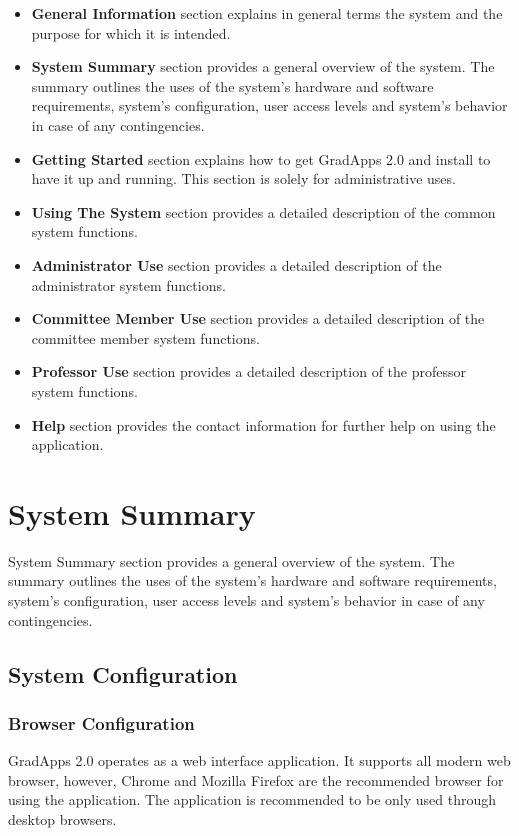 \documentclass[fontsize=12pt,paper=letter,twoside]{scrartcl}
\begin{document}
\begin{itemize}
\item \textbf{General Information} section explains in general terms the system and the purpose for which it is
intended.
\item \textbf{System Summary} section provides a general overview of the system. The summary outlines the uses of
the system’s hardware and software requirements, system’s configuration, user access levels and
system’s behavior in case of any contingencies.
\item \textbf{Getting Started} section explains how to get GradApps 2.0 and install to have it up and running. This section is solely for administrative uses.
\item \textbf{Using The System} section provides a detailed description of the common system functions.
\item \textbf{Administrator Use} section provides a detailed description of the administrator system functions.
\item \textbf{Committee Member Use} section provides a detailed description of the committee member system functions.
\item \textbf{Professor Use} section provides a detailed description of the professor system functions.
\item \textbf{Help} section provides the contact information for further help on using the application.
\end{itemize}

\newpage
\section{System Summary}
System Summary section provides a general overview of the system. The summary outlines the uses of
the system's hardware and software requirements, system’s configuration, user access levels and
system’s behavior in case of any contingencies.

\subsection{System Configuration} \label{system_conf}

\subsubsection{Browser Configuration}
GradApps 2.0 operates as a web interface application. It supports all modern web browser, however, Chrome and Mozilla Firefox are the recommended browser for using the application. The application is recommended to be only used through desktop browsers.
\end{document}
